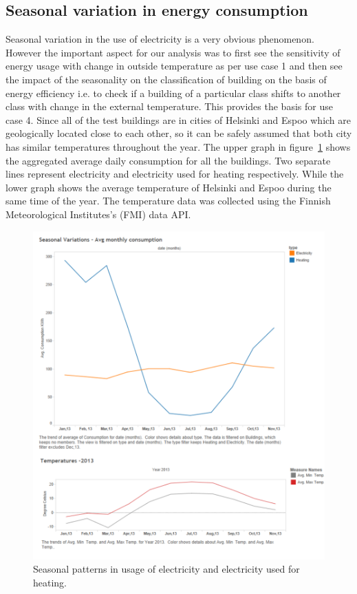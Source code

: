 \subsection{Seasonal variation in energy consumption}
Seasonal variation in the use of electricity is a very obvious phenomenon. However the important aspect for our analysis was to first see the sensitivity of energy usage with change in outside temperature as per use case 1 and then see the impact of the seasonality on the classification of building on the basis of energy efficiency i.e. to check if a building of a particular class shifts to another class with change in the external temperature. This provides the basis for use case 4. Since all of the test buildings are in cities of Helsinki and Espoo which are geologically located close to each other, so it can be safely assumed that both city has similar temperatures throughout the year. The upper graph in figure~\ref{fig:season} shows the aggregated average daily consumption for all the buildings. Two separate lines represent electricity and electricity used for heating respectively. While the lower graph shows the average temperature of Helsinki and Espoo during the same time of the year. The temperature data was collected using the Finnish Meteorological Institutes's (FMI) data API.       
 
\begin{figure}[!ht]
    \begin{center}
      \includegraphics[scale = 0.7]{images/season.pdf}
      \caption{Seasonal patterns in usage of electricity and electricity used for heating.}
      \label{fig:season}
    \end{center}
  \end{figure} 

